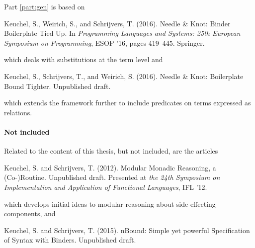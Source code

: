 {Part \ref{part:gen} is based on

\begin{center}
  \begin{minipage}{0.85\columnwidth}
    Keuchel, S., Weirich, S., and Schrijvers, T. (2016).
    \newblock Needle {\&} {K}not: {B}inder {B}oilerplate {T}ied {U}p.
    \newblock In {\em Programming Languages and Systems: 25th European Symposium
      on Programming}, ESOP '16, pages 419--445. Springer.
  \end{minipage}
\end{center}
\noindent which deals with substitutions at the term level and
\begin{center}
  \begin{minipage}{0.85\columnwidth}
    Keuchel, S.,  Schrijvers, T., and Weirich, S. (2016).
    \newblock Needle {\&} {K}not: {B}oilerplate {B}ound {T}ighter.
    \newblock Unpublished draft.
  \end{minipage}
\end{center}
\noindent which extends the framework further to include predicates on terms
expressed as relations.


\paragraph{Not included}

Related to the content of this thesis, but not included, are the articles

\begin{center}
  \begin{minipage}{0.85\columnwidth}
    Keuchel, S. and Schrijvers, T. (2012).
    \newblock Modular Monadic Reasoning, a (Co-)Routine.
    \newblock Unpublished draft.
    \newblock Presented at \emph{the 24th Symposium on Implementation and
      Application of Functional Languages}, IFL '12.
  \end{minipage}
\end{center}
\noindent which develops initial ideas to modular reasoning about side-effecting
components, and

\begin{center}
  \begin{minipage}{0.85\columnwidth}
    Keuchel, S. and Schrijvers, T. (2015).
    n{B}ound: {S}imple yet powerful {S}pecification of {S}yntax
      with {B}inders.
    \newblock Unpublished draft.
  \end{minipage}
\end{center}

}
